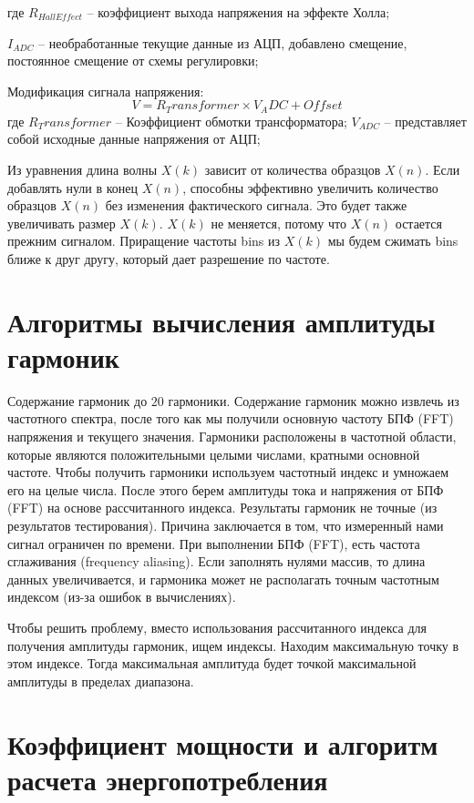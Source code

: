 где $R_{HallEffect}$ -- коэффициент выхода напряжения на эффекте Холла;

$I_{ADC}$ -- необработанные текущие данные из АЦП, добавлено смещение, постоянное смещение от схемы регулировки;

Модификация сигнала напряжения:
\begin{equation}
\label{eq:equation3}
V = R_Trans former\times V_ADC + Offset
\end{equation}
где $R_Trans former$ -- Коэффициент обмотки трансформатора;
$V_{ADC}$ -- представляет собой исходные данные напряжения от АЦП;

Из уравнения  длина волны $X(k)$ зависит от количества образцов $X(n)$. Если добавлять нули в конец $X(n)$, способны эффективно увеличить количество образцов $X(n)$ без изменения фактического сигнала. Это будет также увеличивать размер $X(k)$. $X(k)$ не меняется, потому что $X(n)$ остается прежним сигналом. Приращение частоты bins из $X(k)$ мы будем сжимать bins ближе к друг другу, который дает разрешение по частоте.

\section{Алгоритмы вычисления амплитуды гармоник} \label{sec:ch2/sec3}

Содержание гармоник до $20$ гармоники. Содержание гармоник можно извлечь из частотного спектра, после того как мы получили основную частоту БПФ (FFT) напряжения и текущего значения. Гармоники расположены в частотной области, которые являются положительными целыми числами, кратными основной частоте. Чтобы получить гармоники используем частотный индекс и умножаем его на целые числа. После этого берем амплитуды тока и напряжения от БПФ (FFT) на основе рассчитанного индекса. Результаты гармоник не точные (из результатов тестирования). Причина заключается в том, что измеренный нами сигнал ограничен по времени. При выполнении БПФ (FFT), есть частота сглаживания (frequency aliasing). Если заполнять нулями массив, то длина данных увеличивается, и гармоника может не располагать точным частотным индексом (из-за ошибок в вычислениях).

Чтобы решить проблему, вместо использования рассчитанного индекса для получения амплитуды гармоник, ищем индексы. Находим максимальную точку в этом индексе. Тогда максимальная амплитуда будет точкой максимальной амплитуды в пределах диапазона.

\section{Коэффициент мощности и алгоритм расчета энергопотребления} \label{sec:ch2/sec4}

